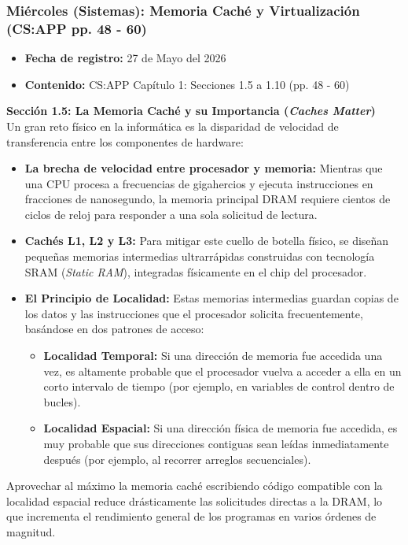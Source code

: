 \documentclass[11pt, a4paper]{article}
\begin{document}
\subsubsection{Miércoles (Sistemas): Memoria Caché y Virtualización (CS:APP pp. 48 - 60)}
\begin{itemize}
  \item[] \textbf{Fecha de registro:} 27 de Mayo del 2026
  \item[] \textbf{Contenido:} CS:APP Capítulo 1: Secciones 1.5 a 1.10 (pp. 48 - 60)
\end{itemize}

\noindent\textbf{Sección 1.5: La Memoria Caché y su Importancia (\textit{Caches Matter})}\\[0.5em]
Un gran reto físico en la informática es la disparidad de velocidad de transferencia entre los componentes de hardware:
\begin{itemize}
  \item \textbf{La brecha de velocidad entre procesador y memoria:} Mientras que una CPU procesa a frecuencias de gigahercios y ejecuta instrucciones en fracciones de nanosegundo, la memoria principal DRAM requiere cientos de ciclos de reloj para responder a una sola solicitud de lectura.
  \item \textbf{Cachés L1, L2 y L3:} Para mitigar este cuello de botella físico, se diseñan pequeñas memorias intermedias ultrarrápidas construidas con tecnología SRAM (\textit{Static RAM}), integradas físicamente en el chip del procesador.
  \item \textbf{El Principio de Localidad:} Estas memorias intermedias guardan copias de los datos y las instrucciones que el procesador solicita frecuentemente, basándose en dos patrones de acceso:
  \begin{itemize}
    \item \textbf{Localidad Temporal:} Si una dirección de memoria fue accedida una vez, es altamente probable que el procesador vuelva a acceder a ella en un corto intervalo de tiempo (por ejemplo, en variables de control dentro de bucles).
    \item \textbf{Localidad Espacial:} Si una dirección física de memoria fue accedida, es muy probable que sus direcciones contiguas sean leídas inmediatamente después (por ejemplo, al recorrer arreglos secuenciales).
  \end{itemize}
\end{itemize}
Aprovechar al máximo la memoria caché escribiendo código compatible con la localidad espacial reduce drásticamente las solicitudes directas a la DRAM, lo que incrementa el rendimiento general de los programas en varios órdenes de magnitud.
\end{document}
